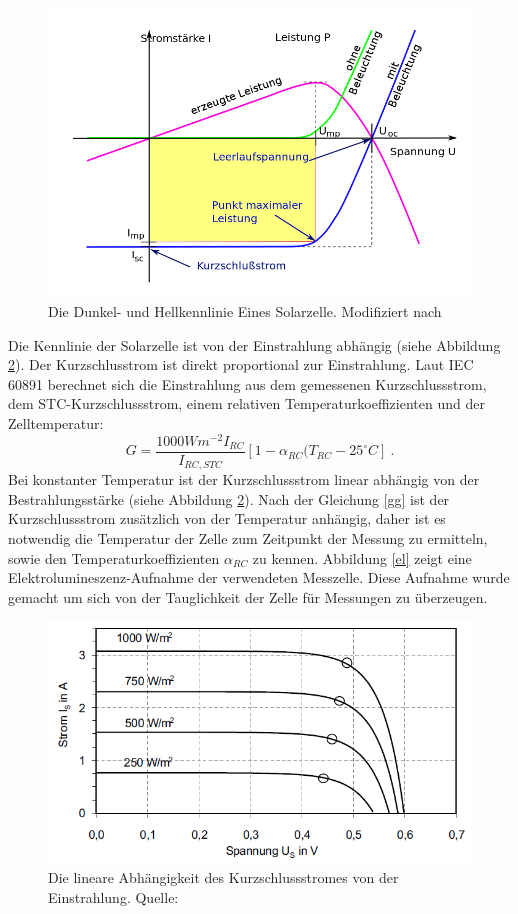 \documentclass[a4paper,bibtotoc,oneside]{scrbook}
\begin{document}
\begin{figure}[htbp]
\centering
\includegraphics[width=125mm]{img/kennlinie.png}
\caption{Die Dunkel- und Hellkennlinie Eines Solarzelle. Modifiziert nach \cite{kl}}\label{kennlinie}
\end{figure}

\noindent Die Kennlinie der Solarzelle ist von der Einstrahlung abhängig (siehe Abbildung \ref{mpp}). Der Kurzschlusstrom ist direkt proportional zur Einstrahlung.
Laut IEC 60891 \cite{norm891} berechnet sich die Einstrahlung aus dem gemessenen Kurzschlussstrom, dem STC-Kurzschlussstrom, einem relativen Temperaturkoeffizienten und der Zelltemperatur:
\begin{equation}
G = \frac{1000Wm^{-2}I_{RC}}{I_{RC,STC}} [1 - \alpha_{RC}(T_{RC}-25^{\circ} C]~.
\label{gg}
\end{equation}
Bei konstanter Temperatur ist der Kurzschlussstrom linear abhängig von der Bestrahlungsstärke (siehe Abbildung \ref{mpp}).
Nach der Gleichung \ref{gg} ist der Kurzschlussstrom zusätzlich von der Temperatur anhängig, daher ist es notwendig die Temperatur der Zelle zum Zeitpunkt der Messung zu ermitteln, sowie den Temperaturkoeffizienten $\alpha_{RC}$ zu kennen.
Abbildung \ref{el} zeigt eine Elektrolumineszenz-Aufnahme der verwendeten Messzelle. Diese Aufnahme wurde gemacht um sich von der Tauglichkeit der Zelle für Messungen zu überzeugen.

\begin{figure}[htbp]
\centering
\includegraphics[width=125mm]{img/kennlinien.png}
\caption{Die lineare Abhängigkeit des Kurzschlussstromes von der Einstrahlung. Quelle: \cite{pv}}\label{mpp}
\end{figure}
\end{document}
